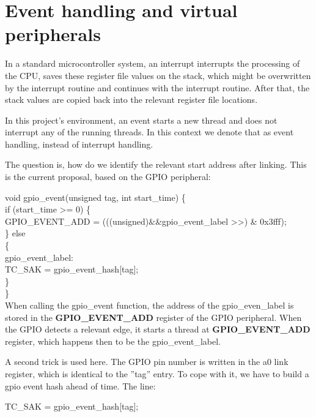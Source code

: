 \chapter{Event handling and virtual peripherals}
\label{atomics}

In a standard microcontroller system, an interrupt interrupts the processing of the CPU, saves these register file values on the stack, which might be overwritten by the interrupt routine and continues with the interrupt routine. After that, the stack values are copied back into the relevant register file locations.

In this project's environment, an event starts a new thread and does not interrupt any of the running threads. In this context we denote that as event handling, instead of interrupt handling.

The question is, how do we identify the relevant start address after linking. This is the current proposal, based on the GPIO peripheral:

void gpio\_event(unsigned tag, int start\_time) \{\\
\indent \space\space\space if (start\_time \textgreater= 0) \{\\
\indent \space\space\space \space\space\space GPIO\_EVENT\_ADD = (((unsigned)\&\&gpio\_event\_label \textgreater\textgreater   {}) \& 0x3fff);\\
\indent \space\space\space \} else\\
\indent \space\space\space \{\\
\indent \space\space\space \space\space\space gpio\_event\_label:\\
\indent \space\space\space \space\space\space \space\space\space TC\_SAK = gpio\_event\_hash[tag];\\
\indent \space\space\space \}\\
\}\\

When calling the gpio\_event function, the address of the gpio\_even\_label is stored in the \textbf{GPIO\_EVENT\_ADD} register of the GPIO peripheral. When the GPIO detects a relevant edge, it starts a thread at \textbf{GPIO\_EVENT\_ADD} register, which happens then to be the  gpio\_event\_label.

A second trick is used here. The GPIO pin number is written in the a0 link register, which is identical to the ''tag'' entry. To cope with it, we have to build a gpio event hash ahead of time. The line:

TC\_SAK = gpio\_event\_hash[tag];

